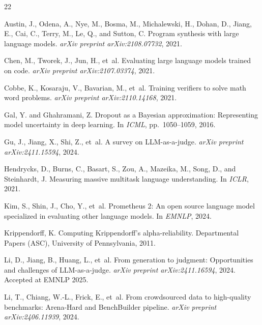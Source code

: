 \documentclass{article}
\begin{document}
\begin{thebibliography}{22}

Austin, J., Odena, A., Nye, M., Bosma, M., Michalewski, H., Dohan, D., Jiang, E., Cai, C., Terry, M., Le, Q., and Sutton, C.
\newblock Program synthesis with large language models.
\newblock \emph{arXiv preprint arXiv:2108.07732}, 2021.

Chen, M., Tworek, J., Jun, H., et~al.
\newblock Evaluating large language models trained on code.
\newblock \emph{arXiv preprint arXiv:2107.03374}, 2021.

Cobbe, K., Kosaraju, V., Bavarian, M., et~al.
\newblock Training verifiers to solve math word problems.
\newblock \emph{arXiv preprint arXiv:2110.14168}, 2021.

Gal, Y. and Ghahramani, Z.
\newblock Dropout as a {B}ayesian approximation: Representing model uncertainty in deep learning.
\newblock In \emph{ICML}, pp.\ 1050--1059, 2016.

Gu, J., Jiang, X., Shi, Z., et~al.
\newblock A survey on {LLM}-as-a-judge.
\newblock \emph{arXiv preprint arXiv:2411.15594}, 2024.

Hendrycks, D., Burns, C., Basart, S., Zou, A., Mazeika, M., Song, D., and Steinhardt, J.
\newblock Measuring massive multitask language understanding.
\newblock In \emph{ICLR}, 2021.

Kim, S., Shin, J., Cho, Y., et~al.
\newblock Prometheus 2: An open source language model specialized in evaluating other language models.
\newblock In \emph{EMNLP}, 2024.

Krippendorff, K.
\newblock Computing {K}rippendorff's alpha-reliability.
\newblock Departmental Papers (ASC), University of Pennsylvania, 2011.

Li, D., Jiang, B., Huang, L., et~al.
\newblock From generation to judgment: Opportunities and challenges of {LLM}-as-a-judge.
\newblock \emph{arXiv preprint arXiv:2411.16594}, 2024{}.
\newblock Accepted at EMNLP 2025.

Li, T., Chiang, W.-L., Frick, E., et~al.
\newblock From crowdsourced data to high-quality benchmarks: {A}rena-{H}ard and {B}ench{B}uilder pipeline.
\newblock \emph{arXiv preprint arXiv:2406.11939}, 2024{}.


\end{thebibliography}
\end{document}

